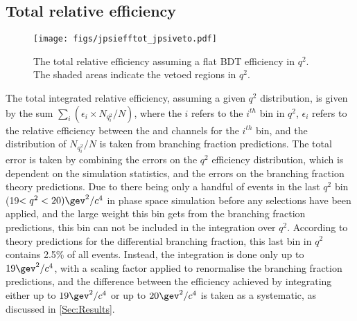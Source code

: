 

 
\subsection{Total relative efficiency}
\label{sec:toteff}
\begin{figure}[!t]\def\nh{0.3\textwidth}
  \centering
  \texttt{[image: figs/jpsiefftot\_jpsiveto.pdf]}
    \caption{The total relative efficiency assuming a flat BDT efficiency in $q^{2}$. The shaded areas indicate the vetoed regions in $q^{2}$.}
\label{Fig:toteff}

\end{figure}
The total integrated relative efficiency, assuming a given $q^{2}$ distribution, is given by the sum $\sum_{i} (\epsilon_{i}\times N_{q^{2}_{i}}/N)$, where the $i$ refers to the $i^{th}$ bin in $q^{2}$, $\epsilon_{i}$ refers to the relative efficiency between the \Lbpi and \Lbpijpsi channels for the $i^{th}$ bin, and the distribution of $N_{q^{2}_{i}}/N$ is taken from \LbL branching fraction predictions. The total error is taken by combining the errors on the $q^{2}$ efficiency distribution, which is dependent on the simulation statistics, and the errors on the \LbL branching fraction theory predictions. Due to there being only a handful of events in the last $q^{2}$ bin (19$<q^{2}<20) \gev^{2}/c^{4}$ in phase space simulation before any selections have been applied, and the large weight this bin gets from the \LbL branching fraction predictions, this bin can not be included in the integration over $q^{2}$. According to \LbL theory predictions for the differential branching fraction, this last bin in $q^{2}$ contains 2.5\% of all events. Instead, the integration is done only up to $19 \gev^{2}/c^{4}$, with a scaling factor applied to renormalise the \LbL branching fraction predictions, and the difference between the efficiency achieved by integrating either up to $19 \gev^{2}/c^{4}$ or up to $20 \gev^{2}/c^{4}$ is taken as a systematic, as discussed in \autoref{Sec:Results}. 


